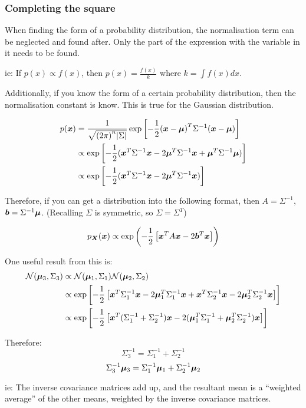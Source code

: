 \documentclass[../../main.tex]{subfiles}
\begin{document}
\subsubsection{Completing the square}

When finding the form of a probability distribution, the normalisation term can be neglected and found after.
Only the part of the expression with the variable in it needs to be found.

ie: If $p(x) \propto f(x)$, then $p(x) = \frac{f(x)}{k}$ where $k = \int f(x) dx$.

Additionally, if you know the form of a certain probability distribution, then the normalisation constant is know.
This is true for the Gaussian distribution.

\begin{align*}
p(\bm{x})
&=
\frac{1}{\sqrt{{(2\pi)}^n|\Sigma|}}
\exp{\left[-\frac{1}{2}{( \bm{x}  -  \bm{\mu} )}^T\Sigma^{-1}( \bm{x}  -  \bm{\mu} )\right]}\\
&\propto
\exp{\left[-\frac{1}{2}( \bm{x} ^T\Sigma^{-1} \bm{x}  - 2 \bm{\mu} ^T\Sigma^{-1} \bm{x}  +  \bm{\mu} ^T\Sigma^{-1} \bm{\mu} )\right]}\\
&\propto
\exp{\left[-\frac{1}{2}( \bm{x} ^T\Sigma^{-1} \bm{x}  - 2 \bm{\mu} ^T\Sigma^{-1} \bm{x} )\right]}\\
\end{align*}

Therefore, if you can get a distribution into the following format, then $A = \Sigma^{-1}$, $\bm{b} = \Sigma^{-1}\bm{\mu}$.
(Recalling $\Sigma$ is symmetric, so $\Sigma = \Sigma^T$)

\[ p_{\bm{X}}(\bm{x}) \propto \exp{\left(-\frac{1}{2}\left[
 \bm{x} ^T A \bm{x}  - 2 \bm{b} ^T \bm{x} 
\right]\right)} \]

One useful result from this is:
\begin{align*}
\mathcal{N}(\bm{\mu}_3, \Sigma_3)
&\propto
\mathcal{N}(\bm{\mu}_1, \Sigma_1)
\mathcal{N}(\bm{\mu}_2, \Sigma_2) \\
&\propto
\exp{\left[-\frac{1}{2}\left[
     \bm{x} ^T\Sigma_1^{-1} \bm{x}  - 2 \bm{\mu} _1^T\Sigma_1^{-1} \bm{x} 
    +  \bm{x} ^T\Sigma_2^{-1} \bm{x}  - 2 \bm{\mu} _2^T\Sigma_2^{-1} \bm{x} 
\right]\right]} \\
&\propto
\exp{\left[-\frac{1}{2}\left[
             \bm{x} ^T(\Sigma_1^{-1} + \Sigma_2^{-1}) \bm{x}  - 2( \bm{\mu} _1^T\Sigma_1^{-1} +  \bm{\mu} _2^T\Sigma_2^{-1}) \bm{x} 
\right]\right]}
\end{align*}

Therefore:
\[ \Sigma_3^{-1} = \Sigma_1^{-1} + \Sigma_2^{-1} \]
\[ \Sigma_3^{-1}\bm{\mu}_3 = \Sigma_1^{-1}\bm{\mu}_1 + \Sigma_2^{-1}\bm{\mu}_2 \]

ie: The inverse covariance matrices add up, and the resultant mean is a ``weighted average'' of the other means, weighted by the inverse covariance matrices.
\end{document}
